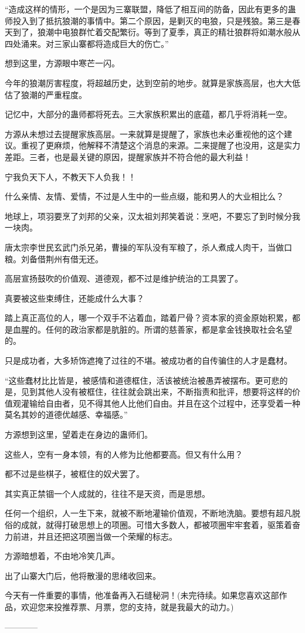\begin{this_body}
“造成这样的情形，一个是因为三寨联盟，降低了相互间的防备，因此有更多的蛊师投入到了抵抗狼潮的事情中。第二个原因，是剿灭的电狼，只是残狼。第三是春天到了，狼潮中电狼群忙着交配繁衍。等到了夏季，真正的精壮狼群将如潮水般从四处涌来。对三家山寨都将造成巨大的伤亡。”

想到这里，方源眼中寒芒一闪。

今年的狼潮厉害程度，将超越历史，达到空前的地步。就算是家族高层，也大大低估了狼潮的严重程度。

记忆中，大部分的蛊师都将死去。三大家族积累出的底蕴，都几乎将消耗一空。

方源从未想过去提醒家族高层。一来就算是提醒了，家族也未必重视他的这个建议。重视了更麻烦，他解释不清楚这个消息的来源。二来提醒了也没用，这是实力差距。三者，也是最关键的原因，提醒家族并不符合他的最大利益！

宁我负天下人，不教天下人负我！！

什么亲情、友情、爱情，不过是人生中的一些点缀，能和男人的大业相比么？

地球上，项羽要烹了刘邦的父亲，汉太祖刘邦笑着说：烹吧，不要忘了到时候分我一块肉。

唐太宗李世民玄武门杀兄弟，曹操的军队没有军粮了，杀人煮成人肉干，当做口粮。刘备借荆州有借无还。

高层宣扬鼓吹的价值观、道德观，都不过是维护统治的工具罢了。

真要被这些束缚住，还能成什么大事？

踏上真正高位的人，哪一个双手不沾着血，踏着尸骨？资本家的资金原始积累，都是血腥的。任何的政治家都是肮脏的。所谓的慈善家，都是拿金钱换取社会名望的。

只是成功者，大多矫饰遮掩了过往的不堪。被成功者的自传骗住的人才是蠢材。

“这些蠢材比比皆是，被感情和道德框住，活该被统治被愚弄被摆布。更可悲的是，见到其他人没有被框住，往往就会跳出来，不断指责和批评，想要将这样的价值观灌输给自由者，见不得其他人比他们自由。并且在这个过程中，还享受着一种莫名其妙的道德优越感、幸福感。”

方源想到这里，望着走在身边的蛊师们。

这些人，空有一身本领，有的人修为比他都要高。但又有什么用？

都不过是些棋子，被框住的奴犬罢了。

其实真正禁锢一个人成就的，往往不是天资，而是思想。

任何一个组织，人一生下来，就被不断地灌输价值观，不断地洗脑。要想有超凡脱俗的成就，就得打破思想上的项圈。可惜大多数人，都被项圈牢牢套着，驱策着奋力前进，并且还把这项圈当做一个荣耀的标志。

方源暗想着，不由地冷笑几声。

出了山寨大门后，他将散漫的思绪收回来。

今天有一件重要的事情，他准备再入石缝秘洞！(未完待续。如果您喜欢这部作品，欢迎您来投推荐票、月票，您的支持，就是我最大的动力。)

------------

\end{this_body}

